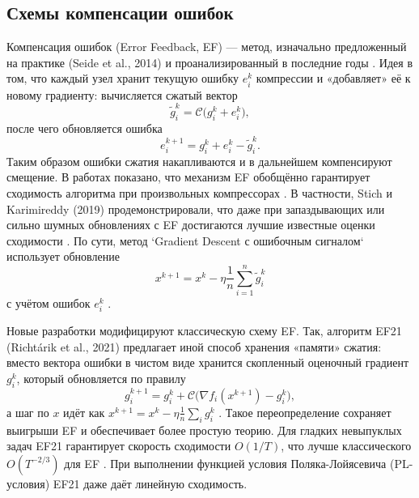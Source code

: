 \subsection{Схемы компенсации ошибок}
    Компенсация ошибок (Error Feedback, EF) — метод, изначально предложенный на практике (Seide et al., 2014) и проанализированный в последние годы \cite{Stich2020,Beznosikov2023}. Идея в том, что каждый узел хранит текущую ошибку \(e_i^k\) компрессии и «добавляет» её к новому градиенту: вычисляется сжатый вектор
    \begin{equation}
    \widetilde{g}_i^k = \mathcal{C}\bigl(g_i^k + e_i^k\bigr),
    \end{equation}
    после чего обновляется ошибка
    \begin{equation}
    e_i^{k+1} = g_i^k + e_i^k - \widetilde{g}_i^k.
    \end{equation}
    Таким образом ошибки сжатия накапливаются и в дальнейшем компенсируют смещение. В работах показано, что механизм EF обобщённо гарантирует сходимость алгоритма при произвольных компрессорах \cite{Stich2020,Vogels2019}. В частности, Stich и Karimireddy (2019) продемонстрировали, что даже при запаздывающих или сильно шумных обновлениях с EF достигаются лучшие известные оценки сходимости \cite{Stich2020}. По сути, метод `Gradient Descent с ошибочным сигналом` использует обновление
    \begin{equation}
    x^{k+1} = x^k - \eta \frac{1}{n}\sum_{i=1}^n \widetilde{g}_i^k
    \end{equation}
    с учётом ошибок \(e_i^k\) \cite{Vogels2019,Beznosikov2023}. 

    Новые разработки модифицируют классическую схему EF. Так, алгоритм EF21 (Richtárik et al., 2021) предлагает иной способ хранения «памяти» сжатия: вместо вектора ошибки в чистом виде хранится скопленный оценочный градиент \(g_i^k\), который обновляется по правилу 
    \begin{equation}
    g_i^{k+1} = g_i^k + \mathcal{C}\bigl(\nabla f_i(x^{k+1}) - g_i^k\bigr),
    \end{equation}
    а шаг по \(x\) идёт как \(x^{k+1}=x^k - \eta\frac{1}{n}\sum_i g_i^k\) \cite{Richtarik2021}. Такое переопределение сохраняет выигрыши EF и обеспечивает более простую теорию. Для гладких невыпуклых задач EF21 гарантирует скорость сходимости \(O(1/T)\), что лучше классического \(O(T^{-2/3})\) для EF \cite{Richtarik2021}. При выполнении функцией условия Поляка-Лойясевича (PL-условия) EF21 даже даёт линейную сходимость. 

